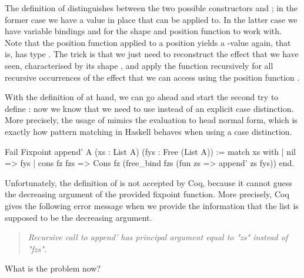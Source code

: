 The definition of  distinguishes between the two possible constructors  and ; in the former case we have a value  in place that  can be applied to.
In the latter case we have variable bindings  and  for the shape and position function to work with.
Note that the position function applied to a position yields a \--value again, that is,  has type
.
The trick is that we just need to reconstruct the effect that we have seen, characterised by its shape , and apply the function  recursively for all recursive occurrences of the effect that we can access using the position function .

With the definition of  at hand, we can go ahead and start the second try to define : now we know that we need to use  instead of an explicit case distinction.
More precisely, the usage of  mimics the evaluation to head normal form, which is exactly how pattern matching in Haskell behaves when using a case distinction.

\begin{coqcode}
Fail Fixpoint append' A (xs : List A) (fys : Free (List A)) :=
  match xs with
  | nil         => fys
  | cons fz fzs => Cons fz (free_bind fzs (fun zs => append' zs fys))
  end.
\end{coqcode}

Unfortunately, the definition of  is not accepted by Coq, because it cannot guess the decreasing argument of the provided fixpoint function.
More precisely, Coq gives the following error message when we provide the information that the list  is supposed to be the decreasing argument.

\begin{quote}
\emph{Recursive call to append' has principal argument equal to "zs" instead of "fzs".}
\end{quote}

What is the problem now?


